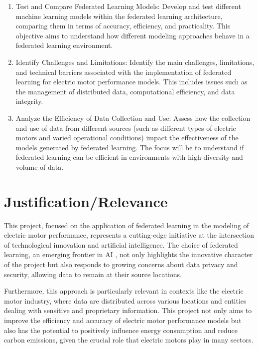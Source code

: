 \documentclass{article}
\begin{document}
\begin{enumerate}
    \item Test and Compare Federated Learning Models: Develop and test different machine learning models within the federated learning architecture, comparing them in terms of accuracy, efficiency, and practicality. This objective aims to understand how different modeling approaches behave in a federated learning environment.
    
    \item Identify Challenges and Limitations: Identify the main challenges, limitations, and technical barriers associated with the implementation of federated learning for electric motor performance models. This includes issues such as the management of distributed data, computational efficiency, and data integrity.
    
    \item Analyze the Efficiency of Data Collection and Use: Assess how the collection and use of data from different sources (such as different types of electric motors and varied operational conditions) impact the effectiveness of the models generated by federated learning. The focus will be to understand if federated learning can be efficient in environments with high diversity and volume of data.

\end{enumerate}

\section{Justification/Relevance}

This project, focused on the application of federated learning in the modeling of electric motor performance, represents a cutting-edge initiative at the intersection of technological innovation and artificial intelligence. The choice of federated learning, an emerging frontier in AI \cite{peter2021advances,ye2023heterogeneous}, not only highlights the innovative character of the project but also responds to growing concerns about data privacy and security, allowing data to remain at their source locations.

Furthermore, this approach is particularly relevant in contexts like the electric motor industry, where data are distributed across various locations and entities dealing with sensitive and proprietary information. This project not only aims to improve the efficiency and accuracy of electric motor performance models but also has the potential to positively influence energy consumption and reduce carbon emissions, given the crucial role that electric motors play in many sectors.
\end{document}
